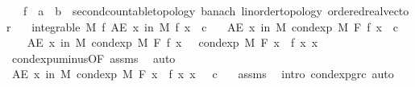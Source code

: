 \begin{isabellebody}
\ \ \ f\ {\isacharcolon}{\kern0pt}{\isacharcolon}{\kern0pt}\ {\isachardoublequoteopen}{\isacharprime}{\kern0pt}a\ {\isasymRightarrow}\ {\isacharprime}{\kern0pt}b\ {\isacharcolon}{\kern0pt}{\isacharcolon}{\kern0pt}\ {\isacharbraceleft}{\kern0pt}second{\isacharunderscore}{\kern0pt}countable{\isacharunderscore}{\kern0pt}topology{\isacharcomma}{\kern0pt}\ banach{\isacharcomma}{\kern0pt}\ linorder{\isacharunderscore}{\kern0pt}topology{\isacharcomma}{\kern0pt}\ ordered{\isacharunderscore}{\kern0pt}real{\isacharunderscore}{\kern0pt}vector{\isacharbraceright}{\kern0pt}{\isachardoublequoteclose}\isanewline
\ \ \ {\isachardoublequoteopen}integrable\ M\ f{\isachardoublequoteclose}\ {\isachardoublequoteopen}AE\ x\ in\ M{\isachardot}{\kern0pt}\ f\ x\ {\isacharless}{\kern0pt}\ c{\isachardoublequoteclose}\isanewline
\ \ \ {\isachardoublequoteopen}AE\ x\ in\ M{\isachardot}{\kern0pt}\ cond{\isacharunderscore}{\kern0pt}exp\ M\ F\ f\ x\ {\isacharless}{\kern0pt}\ c{\isachardoublequoteclose}\isanewline
%
\isadelimproof
%
\endisadelimproof
%
\isatagproof
{}\isamarkupfalse%
\ {\isacharminus}{\kern0pt}\isanewline
\ \ \isamarkupfalse%
\ {\isachardoublequoteopen}AE\ x\ in\ M{\isachardot}{\kern0pt}\ cond{\isacharunderscore}{\kern0pt}exp\ M\ F\ f\ x\ {\isacharequal}{\kern0pt}\ {\isacharminus}{\kern0pt}\ cond{\isacharunderscore}{\kern0pt}exp\ M\ F\ {\isacharparenleft}{\kern0pt}{\isasymlambda}x{\isachardot}{\kern0pt}\ {\isacharminus}{\kern0pt}\ f\ x{\isacharparenright}{\kern0pt}\ x{\isachardoublequoteclose}\ \isamarkupfalse%
\ cond{\isacharunderscore}{\kern0pt}exp{\isacharunderscore}{\kern0pt}uminus{\isacharbrackleft}{\kern0pt}OF\ assms{\isacharparenleft}{\kern0pt}{}{\isacharparenright}{\kern0pt}{\isacharbrackright}{\kern0pt}\ \isamarkupfalse%
\ auto\isanewline
\ \ \isamarkupfalse%
\ \isamarkupfalse%
\ {\isachardoublequoteopen}AE\ x\ in\ M{\isachardot}{\kern0pt}\ cond{\isacharunderscore}{\kern0pt}exp\ M\ F\ {\isacharparenleft}{\kern0pt}{\isasymlambda}x{\isachardot}{\kern0pt}\ {\isacharminus}{\kern0pt}\ f\ x{\isacharparenright}{\kern0pt}\ x\ {\isachargreater}{\kern0pt}\ {\isacharminus}{\kern0pt}\ c{\isachardoublequoteclose}\ \ \isamarkupfalse%
\ assms\ \isamarkupfalse%
\ {\isacharparenleft}{\kern0pt}intro\ cond{\isacharunderscore}{\kern0pt}exp{\isacharunderscore}{\kern0pt}gr{\isacharunderscore}{\kern0pt}c{\isacharparenright}{\kern0pt}\ auto\isanewline
\ \ \isamarkupfalse%

\end{isabellebody}
